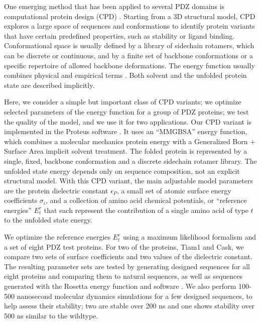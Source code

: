 \documentclass[12pt]{article}
\begin{document}
One emerging method that has been applied to several PDZ domains is computational protein design (CPD) \cite{Kuhlman06,
Lippow07,Dai10,Feldmeier13,Tinberg13,Au16}. Starting from a 3D structural model, CPD explores a large space of sequences and
conformations to identify protein variants that have certain predefined properties, such as stability or ligand binding.
Conformational space is usually defined by a library of sidechain rotamers, which can be discrete or continuous, and by
a finite set of backbone conformations or a specific repertoire of allowed backbone deformations. The energy function
usually combines physical and empirical terms \cite{Pokala04,Samish11,Li13}. Both solvent and the unfolded protein state
are described implicitly. 

Here, we consider a simple but important class of CPD variants; we optimize selected parameters of the energy function for
a group of PDZ proteins; we test the quality of the model, and we use it for two applications. Our CPD variant is implemented
in the Proteus software \cite{Schmidt08,Simonson13b,Polydorides16}. It uses an ``MMGBSA'' energy function, which combines
a molecular mechanics protein energy with a Generalized Born + Surface Area implicit solvent treatment. The folded protein
is represented by a single, fixed, backbone conformation and a discrete sidechain rotamer library. The unfolded state energy
depends only on sequence composition, not an explicit structural model. With this CPD variant, the main adjustable model
parameters are the protein dielectric constant $\epsilon_P$, a small set of atomic surface energy coefficients $\sigma_i$, and
a collection of amino acid chemical potentials, or ``reference energies'' $E^r_t$ that each represent the contribution of a
single amino acid of type $t$ to the unfolded state energy.

We optimize the reference energies $E^r_t$ using a maximum likelihood formalism and a set of eight PDZ test proteins. For two
of the proteins, Tiam1 and Cask, we compare two sets of surface coefficients and two values of the dielectric constant. The
resulting parameter sets are tested by generating designed sequences for all eight proteins and comparing them to natural
sequences, as well as sequences generated with the Rosetta energy function and software \cite{Baker06b}. We also perform
100-500 nanosecond molecular dynamics simulations for a few designed sequences, to help assess their stability; two are stable
over 200 ns and one shows stability over 500 ns similar to the wildtype.
\end{document}
